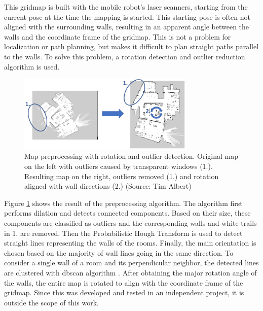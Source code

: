 This gridmap is built with the mobile robot's laser scanners, starting from the current pose at the time the mapping is started. This starting pose is often not aligned with the surrounding walls, resulting in an apparent angle between the walls and the coordinate frame of the gridmap. This is not a problem for localization or path planning, but makes it difficult to plan straight paths parallel to the walls. To solve this problem, a rotation detection and outlier reduction algorithm is used.

\begin{figure}[h]
    \centering
    \includegraphics[width=0.75\textwidth]{figures/50_implementation/model_preprocessing_goal.png}
    \caption[Map preprocessing with rotation and outlier detection]{Map preprocessing with rotation and outlier detection. Original map on the left with outliers caused by transparent windows (1.). Resulting map on the right, outliers removed (1.) and rotation aligned with wall directions (2.) (Source: Tim Albert)}
    \label{fig:map_preprocessing}
\end{figure}

Figure \ref{fig:map_preprocessing} shows the result of the preprocessing algorithm. The algorithm first performs dilation and detects connected components. Based on their size, these components are classified as outliers and the corresponding walls and white trails in 1. are removed. Then the Probabilistic Hough Transform \cite{matas_robust_2000} is used to detect straight lines representing the walls of the rooms. Finally, the main orientation is chosen based on the majority of wall lines going in the same direction. To consider a single wall of a room and its perpendicular neighbor, the detected lines are clustered with \gls{dbscan} algorithm \cite{ester_density-based_1996}. After obtaining the major rotation angle of the walls, the entire map is rotated to align with the coordinate frame of the gridmap. Since this was developed and tested in an independent project, it is outside the scope of this work.

